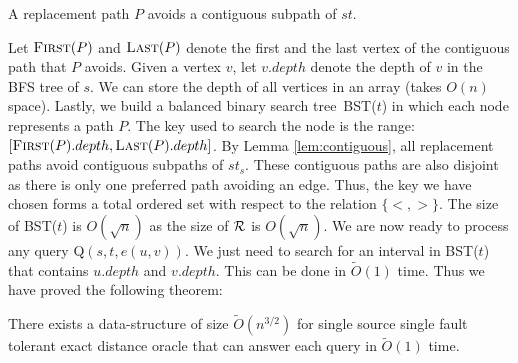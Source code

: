 \begin{lemma}
\label{lem:contiguous}

A replacement path $P$ avoids a contiguous subpath of $st$.
\end{lemma}
\iflong
\else

\fi
Let $\textsc{First}(P)$ and $\textsc{Last}(P)$ denote the first and the last vertex of the contiguous path that $P$ avoids. Given a vertex $v$, let $v.depth$ denote the depth of $v$ in the BFS tree of $s$.  We can store the depth of all  vertices in an array (takes $O(n)$ space). Lastly, we build a balanced binary search tree\ BST($t$) in which each node represents a path $P$. The key used to search the node is the range: $[\textsc{First}(P).depth, \textsc{Last}(P).depth]$. By Lemma \ref{lem:contiguous}, all  replacement paths avoid  contiguous subpaths of $st_s$.  These contiguous paths are also disjoint as there is only one preferred path avoiding an edge. Thus, the key we have chosen forms a total ordered set with respect to the relation $\{ <,>\}$.  The size of BST($t$) is $O(\sqrt n)$ as the size of $\mathcal{R}$ is $O(\sqrt n)$. We are now ready to process any query {\sc Q}$(s,t,e(u,v))$. We just need to search for an interval in BST($t$) that contains $u.depth$ and $v.depth$. This can be done in $\tilde O(1)$ time. Thus we have proved the following theorem:

\begin{theorem}
There exists a data-structure of size $\tilde O(n^{3/2})$ for single source single fault tolerant exact distance oracle that can answer each query in $\tilde O(1)$ time.
\end{theorem}
